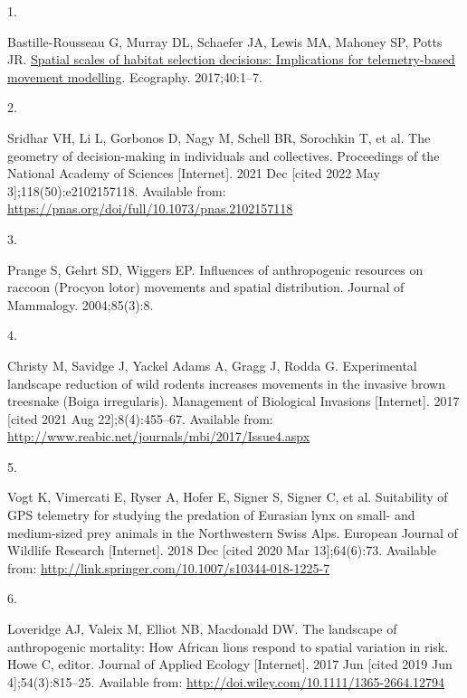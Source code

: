 \documentclass[10pt,a4paper]{article}
\newlength{\cslhangindent}
\newlength{\csllabelwidth}
\newenvironment{CSLReferences}[2] %
{\begin{list}{}{%
	\setlength{\itemindent}{0pt}
	\setlength{\leftmargin}{0pt}
	\setlength{\parsep}{0pt}
	\ifodd #1
	\setlength{\leftmargin}{\cslhangindent}
	\setlength{\itemindent}{-1\cslhangindent}
	\fi
	\setlength{\itemsep}{#2\baselineskip}}}
{\end{list}}
\newcommand{\CSLLeftMargin}[1]{\parbox[t]{\csllabelwidth}{\strut#1\strut}}
\newcommand{\CSLRightInline}[1]{\parbox[t]{\linewidth - \csllabelwidth}{\strut#1\strut}}
\begin{document}
\label{refs}
\begin{CSLReferences}{0}{1}
\CSLLeftMargin{1. }%
\CSLRightInline{Bastille-Rousseau G, Murray DL, Schaefer JA, Lewis MA, Mahoney SP, Potts JR. \href{https://doi.org/10.1111/ecog.02655}{Spatial scales of habitat selection decisions: {Implications} for telemetry-based movement modelling}. Ecography. 2017;40:1--7. }

\CSLLeftMargin{2. }%
\CSLRightInline{Sridhar VH, Li L, Gorbonos D, Nagy M, Schell BR, Sorochkin T, et al. The geometry of decision-making in individuals and collectives. Proceedings of the National Academy of Sciences {[}Internet{]}. 2021 Dec {[}cited 2022 May 3{]};118(50):e2102157118. Available from: \url{https://pnas.org/doi/full/10.1073/pnas.2102157118}}

\CSLLeftMargin{3. }%
\CSLRightInline{Prange S, Gehrt SD, Wiggers EP. Influences of anthropogenic resources on raccoon ({Procyon} lotor) movements and spatial distribution. Journal of Mammalogy. 2004;85(3):8. }

\CSLLeftMargin{4. }%
\CSLRightInline{Christy M, Savidge J, Yackel Adams A, Gragg J, Rodda G. Experimental landscape reduction of wild rodents increases movements in the invasive brown treesnake ({Boiga} irregularis). Management of Biological Invasions {[}Internet{]}. 2017 {[}cited 2021 Aug 22{]};8(4):455--67. Available from: \url{http://www.reabic.net/journals/mbi/2017/Issue4.aspx}}

\CSLLeftMargin{5. }%
\CSLRightInline{Vogt K, Vimercati E, Ryser A, Hofer E, Signer S, Signer C, et al. Suitability of {GPS} telemetry for studying the predation of {Eurasian} lynx on small- and medium-sized prey animals in the {Northwestern} {Swiss} {Alps}. European Journal of Wildlife Research {[}Internet{]}. 2018 Dec {[}cited 2020 Mar 13{]};64(6):73. Available from: \url{http://link.springer.com/10.1007/s10344-018-1225-7}}

\CSLLeftMargin{6. }%
\CSLRightInline{Loveridge AJ, Valeix M, Elliot NB, Macdonald DW. The landscape of anthropogenic mortality: How {African} lions respond to spatial variation in risk. Howe C, editor. Journal of Applied Ecology {[}Internet{]}. 2017 Jun {[}cited 2019 Jun 4{]};54(3):815--25. Available from: \url{http://doi.wiley.com/10.1111/1365-2664.12794}}


\end{CSLReferences}
\end{document}
